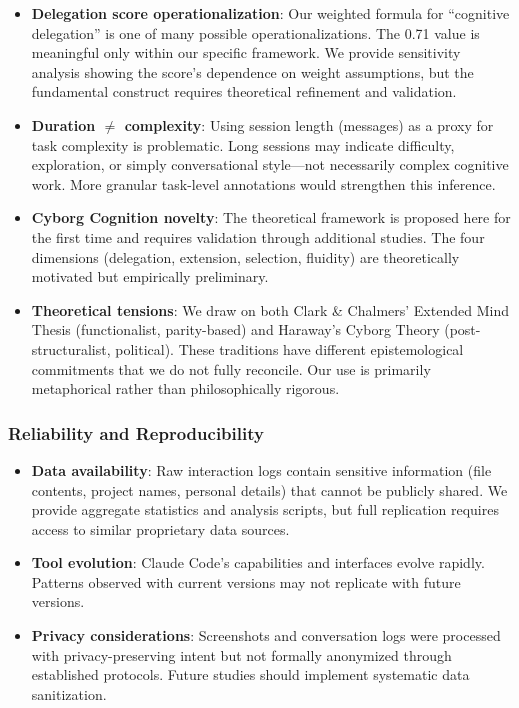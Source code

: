 \documentclass{ntlabs-preprint}
\begin{document}
\begin{itemize}
    \item \textbf{Delegation score operationalization}: Our weighted formula for ``cognitive delegation'' is one of many possible operationalizations. The 0.71 value is meaningful only within our specific framework. We provide sensitivity analysis showing the score's dependence on weight assumptions, but the fundamental construct requires theoretical refinement and validation.

    \item \textbf{Duration $\neq$ complexity}: Using session length (messages) as a proxy for task complexity is problematic. Long sessions may indicate difficulty, exploration, or simply conversational style---not necessarily complex cognitive work. More granular task-level annotations would strengthen this inference.

    \item \textbf{Cyborg Cognition novelty}: The theoretical framework is proposed here for the first time and requires validation through additional studies. The four dimensions (delegation, extension, selection, fluidity) are theoretically motivated but empirically preliminary.

    \item \textbf{Theoretical tensions}: We draw on both Clark \& Chalmers' Extended Mind Thesis (functionalist, parity-based) and Haraway's Cyborg Theory (post-structuralist, political). These traditions have different epistemological commitments that we do not fully reconcile. Our use is primarily metaphorical rather than philosophically rigorous.
\end{itemize}

\subsubsection{Reliability and Reproducibility}

\begin{itemize}
    \item \textbf{Data availability}: Raw interaction logs contain sensitive information (file contents, project names, personal details) that cannot be publicly shared. We provide aggregate statistics and analysis scripts, but full replication requires access to similar proprietary data sources.

    \item \textbf{Tool evolution}: Claude Code's capabilities and interfaces evolve rapidly. Patterns observed with current versions may not replicate with future versions.

    \item \textbf{Privacy considerations}: Screenshots and conversation logs were processed with privacy-preserving intent but not formally anonymized through established protocols. Future studies should implement systematic data sanitization.
\end{itemize}
\end{document}
